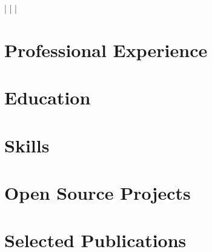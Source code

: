 \documentclass[a4paper,11pt]{article}
\begin{document}
    \begin{center}
        \myName
        \myAddress
        \myWebsite | \myMailAddress | \myGithub | \myPhoneNumber
    \end{center}

    \section{Professional Experience}
        \begin{itemize}
            \postdocDense
                \cvItemizeBegin
                    \postdocOne
                    \postdocTwo
                \cvItemizeEnd
            \expFlowersDense
                \cvItemizeBegin
                    \expFlowersOne
                    \expFlowersTwo
                \cvItemizeEnd
            \expInfineonDense
                \cvItemizeBegin
                    \expInfineonOne
                    \expInfineonTwo
                \cvItemizeEnd
            \expSliveDense
                \cvItemizeBegin
                    \expSliveOne
                    \expSliveTwo
                \cvItemizeEnd
        \end{itemize}

    \section{Education}
        \begin{itemize}
            \phdDense
            \mscDense
            \erasmusDense
            \bscDense
        \end{itemize}

    \section{Skills}
        \begin{itemize}
            \skillsProgramming
            \skillsLanguages
        \end{itemize}

    \section{Open Source Projects}
        \begin{itemize}
            \fossHPZ
                \cvItemizeBegin
                    \fossHPZOne
                    \fossHPZTwo
                    \fossHPZThree
                \cvItemizeEnd
            \fossConvSnn
                \cvItemizeBegin
                    \fossConvSnnOne
                    \fossConvSnnTwo
                \cvItemizeEnd
        \end{itemize}

    \section{Selected Publications}
        \publicationItemizeBegin
            \publicationInCIT
            \publicationAAAI
            \publicationSpikingTransformer
            \seeGoogleScholar
        \publicationItemizeEnd
\end{document}
